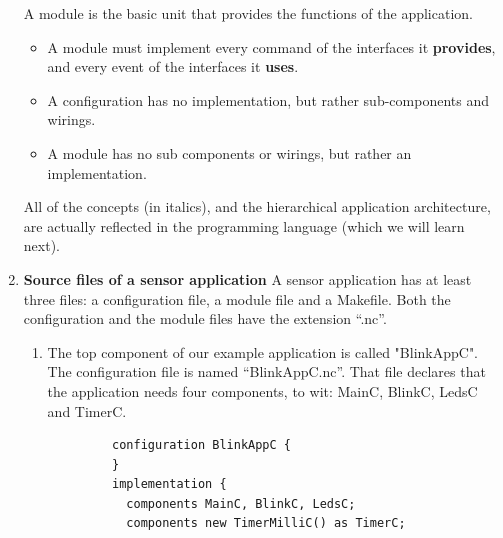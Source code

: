 \documentclass[letterpaper,12pt]{article}
\begin{document}
\begin{enumerate}
   A module is the basic unit that provides the functions of the application.
   \begin{itemize}
      \item A module must implement every command of the interfaces it \textbf{provides}, and every event of the interfaces it \textbf{uses}.
      \item A configuration has no implementation, but rather sub-components and wirings.
      \item A module has no sub components or wirings, but rather an implementation.
   \end{itemize}

   All of the concepts (in italics), and the hierarchical application architecture, are actually reflected in the programming language (which we will learn next).

\item \textbf{Source files of a sensor application}
   A sensor application has at least three files: a configuration file, a module file and a Makefile.
   Both the configuration and the module files have the extension “.nc”.

   \begin{enumerate}
      \item The top component of our example application is called "BlinkAppC".
         The configuration file is named “BlinkAppC.nc”. That file declares that the application needs four components, to wit: MainC, BlinkC, LedsC and TimerC.
         \begin{lstlisting}
         configuration BlinkAppC {
         }
         implementation {
           components MainC, BlinkC, LedsC;
           components new TimerMilliC() as TimerC;


\end{lstlisting}
\end{enumerate}
\end{enumerate}
\end{document}
